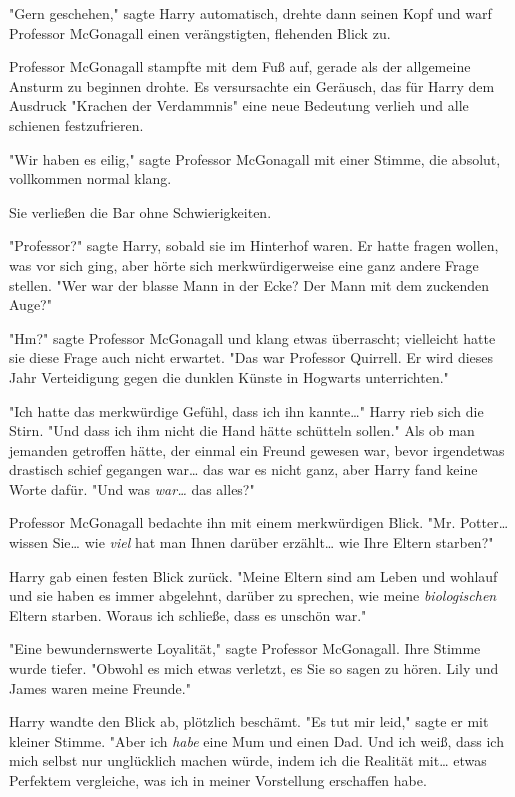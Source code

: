 {"Gern geschehen," sagte Harry automatisch, drehte dann seinen Kopf und warf Professor McGonagall einen verängstigten, flehenden Blick zu.

Professor McGonagall stampfte mit dem Fuß auf, gerade als der allgemeine Ansturm zu beginnen drohte. Es versursachte ein Geräusch, das für Harry dem Ausdruck "Krachen der Verdammnis" eine neue Bedeutung verlieh und alle schienen festzufrieren.

"Wir haben es eilig," sagte Professor McGonagall mit einer Stimme, die absolut, vollkommen normal klang.

Sie verließen die Bar ohne Schwierigkeiten.

"Professor?" sagte Harry, sobald sie im Hinterhof waren. Er hatte fragen wollen, was vor sich ging, aber hörte sich merkwürdigerweise eine ganz andere Frage stellen. "Wer war der blasse Mann in der Ecke? Der Mann mit dem zuckenden Auge?"

"Hm?" sagte Professor McGonagall und klang etwas überrascht; vielleicht hatte sie diese Frage auch nicht erwartet. "Das war Professor Quirrell. Er wird dieses Jahr Verteidigung gegen die dunklen Künste in Hogwarts unterrichten."

"Ich hatte das merkwürdige Gefühl, dass ich ihn kannte…" Harry rieb sich die Stirn. "Und dass ich ihm nicht die Hand hätte schütteln sollen." Als ob man jemanden getroffen hätte, der einmal ein Freund gewesen war, bevor irgendetwas drastisch schief gegangen war… das war es nicht ganz, aber Harry fand keine Worte dafür. "Und was \emph{war…} das alles?"

Professor McGonagall bedachte ihn mit einem merkwürdigen Blick. "Mr. Potter… wissen Sie… wie \emph{viel} hat man Ihnen darüber erzählt… wie Ihre Eltern starben?"

Harry gab einen festen Blick zurück. "Meine Eltern sind am Leben und wohlauf und sie haben es immer abgelehnt, darüber zu sprechen, wie meine \emph{biologischen} Eltern starben. Woraus ich schließe, dass es unschön war."

"Eine bewundernswerte Loyalität," sagte Professor McGonagall. Ihre Stimme wurde tiefer. "Obwohl es mich etwas verletzt, es Sie so sagen zu hören. Lily und James waren meine Freunde."

Harry wandte den Blick ab, plötzlich beschämt. "Es tut mir leid," sagte er mit kleiner Stimme. "Aber ich \emph{habe} eine Mum und einen Dad. Und ich weiß, dass ich mich selbst nur unglücklich machen würde, indem ich die Realität mit… etwas Perfektem vergleiche, was ich in meiner Vorstellung erschaffen habe.

}
